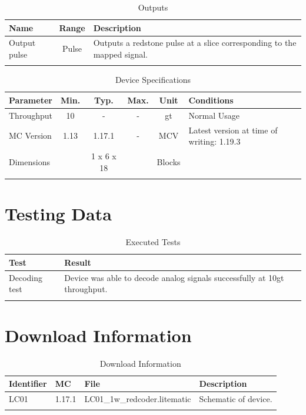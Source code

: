 \documentclass[10pt]{datasheet}
\begin{document}
\begin{table}[h]
    \caption{Outputs}
    \begin{tabularx}{\textwidth}{l | c | X}
        \thickhline
        \textbf{Name} & \textbf{Range} & \textbf{Description} \\
        \hline
        Output pulse & Pulse & Outputs a redstone pulse at a slice corresponding to the mapped signal. \\
        \thickhline
\end{tabularx}
\end{table}

\begin{table}[h]
    \caption{Device Specifications}
    \begin{tabularx}{\textwidth}{l | c c c | c | X}
        \thickhline
        \textbf{Parameter} & \textbf{Min.} & \textbf{Typ.} & \textbf{Max.} &
        \textbf{Unit} & \textbf{Conditions} \\
        \hline
        Throughput  & 10 & - & - & gt & Normal Usage \\
        \hline
        MC Version & 1.13 & 1.17.1 & - & MCV & Latest version at time of writing: 1.19.3\\
        \hline
        Dimensions & & 1 x 6 x 18 & & Blocks & \\
        \thickhline
\end{tabularx}
\end{table}
\newpage
\section{Testing Data}
\begin{table}[h]
\caption{Executed Tests}
\begin{tabularx}{\textwidth}{l | X}
    \thickhline
    \textbf{Test} & \textbf{Result} \\
    \hline
    Decoding test & Device was able to decode analog signals successfully at 10gt throughput. \\
    \thickhline
\end{tabularx}
\end{table}

\section{Download Information}
\begin{table}[h]
    \caption{Download Information}
    \begin{tabularx}{\textwidth}{l | l | l | X}
        \thickhline
        \textbf{Identifier} & \textbf{MC} & \textbf{File} & \textbf{Description} \\
        \hline
        LC01 & 1.17.1 & LC01\_1w\_redcoder.litematic & Schematic of device. \\
        \hline
        \thickhline
    \end{tabularx}
\end{table}
\end{document}
